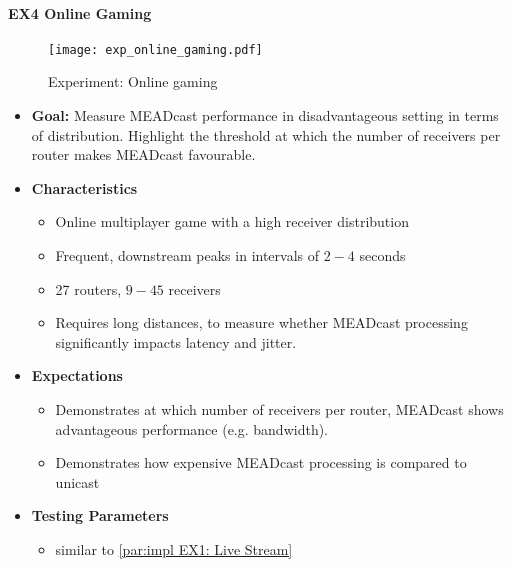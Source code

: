 \paragraph{EX4 Online Gaming} %
\label{par:EX4 Online Gaming}

\begin{figure}[!htbp]
    \begin{center}
        \texttt{[image: exp\_online\_gaming.pdf]}
    \end{center}
    \caption{Experiment: Online gaming}
    \label{fig:exp_online_gaming}
\end{figure}

\begin{itemize}\itemsep0em
    \item \textbf{Goal:} Measure MEADcast performance in disadvantageous
        setting in terms of distribution.
        Highlight the threshold at which the number of receivers per router
        makes MEADcast favourable. 
    \item[] \textbf{Characteristics}
    \begin{itemize}\itemsep0em
        \item Online multiplayer game with a high receiver distribution
        \item Frequent, downstream peaks in intervals of $2-4$ seconds
            \cite{cartesian_us_bw}
        \item 27 routers, $9-45$ receivers
        \item Requires long distances, to measure whether MEADcast processing
            significantly impacts latency and jitter.
    \end{itemize}
    \item[] \textbf{Expectations}
    \begin{itemize}\itemsep0em
        \item Demonstrates at which number of receivers per router, MEADcast
            shows advantageous performance (e.g. bandwidth).
        \item Demonstrates how expensive MEADcast processing is compared to
            unicast
    \end{itemize}
    \item[] \textbf{Testing Parameters}
    \begin{itemize}\itemsep0em
        \item similar to \autoref{par:impl EX1: Live Stream}
    \end{itemize}
\end{itemize}

